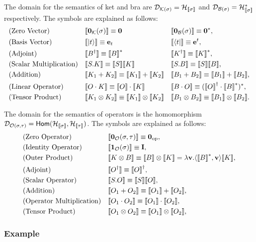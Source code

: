 \begin{definition}
  The domain for the semantics of ket and bra are $\mathcal{D}_{\mathcal{K}(\sigma)} = \mathcal{H}_{{\llbracket \sigma \rrbracket}}$ and $\mathcal{D}_{\mathcal{B}(\sigma)} = \mathcal{H}_{{\llbracket \sigma \rrbracket}}^*$ respectively.
  The symbols are explained as follows:
  \begin{align*}
    & \text{(Zero Vector)} &&
    {\llbracket \mathbf{0}_\mathcal{K}(\sigma) \rrbracket} \equiv \mathbf{0} && {\llbracket \mathbf{0}_\mathcal{B}(\sigma) \rrbracket} \equiv \mathbf{0}^*, \\
    & \text{(Basis Vector)} &&
    {\llbracket \ket{t} \rrbracket} \equiv \mathbf{e}_t && {\llbracket \bra{t} \rrbracket} \equiv \mathbf{e}^t, \\
    & \text{(Adjoint)} &&
    {\llbracket B^\dagger \rrbracket} \equiv {\llbracket B \rrbracket}^* && {\llbracket K^\dagger \rrbracket} \equiv {\llbracket K \rrbracket}^*, \\
    & \text{(Scalar Multiplication)} &&
    {\llbracket S.K \rrbracket} \equiv {\llbracket S \rrbracket} {\llbracket K \rrbracket} && {\llbracket S.B \rrbracket} \equiv {\llbracket S \rrbracket} {\llbracket B \rrbracket}, \\
    & \text{(Addition)} &&
    {\llbracket K_1 + K_2 \rrbracket} \equiv {\llbracket K_1 \rrbracket} + {\llbracket K_2 \rrbracket} && {\llbracket B_1 + B_2 \rrbracket} \equiv {\llbracket B_1 \rrbracket} + {\llbracket B_2 \rrbracket}, \\
    & \text{(Linear Operator)} &&
    {\llbracket O \cdot K \rrbracket} \equiv {\llbracket O \rrbracket} \cdot {\llbracket K \rrbracket} && {\llbracket B \cdot O \rrbracket} \equiv ({\llbracket O \rrbracket}^\dagger \cdot {\llbracket B \rrbracket}^*)^*, \\
    & \text{(Tensor Product)} &&
    {\llbracket K_1 \otimes K_2 \rrbracket} \equiv {\llbracket K_1 \rrbracket} \otimes {\llbracket K_2 \rrbracket} && {\llbracket B_1 \otimes B_2 \rrbracket} \equiv {\llbracket B_1 \rrbracket} \otimes {\llbracket B_2 \rrbracket}.
  \end{align*}
\end{definition}



\begin{definition}
  The domain for the semantics of operators is the homomorphism $\mathcal{D}_{\mathcal{O}(\sigma, \tau)} = \textsf{Hom}(\mathcal{H}_{\llbracket \sigma \rrbracket}, \mathcal{H}_{\llbracket \tau \rrbracket})$.
  The symbols are explained as follows:
  \begin{align*}
    & \text{(Zero Operator)} &&
    {\llbracket \mathbf{0}_\mathcal{O}(\sigma, \tau) \rrbracket} \equiv \mathbf{0}_{\textrm{op}}, \\
    & \text{(Identity Operator)} &&
    {\llbracket \mathbf{1}_\mathcal{O}(\sigma) \rrbracket} \equiv \mathbf{I}, \\
    & \text{(Outer Product)} &&
    {\llbracket K \otimes B \rrbracket} \equiv {\llbracket B \rrbracket} \otimes {\llbracket K \rrbracket} = \lambda \mathbf{v}. \langle {\llbracket B \rrbracket}^*, \mathbf{v}\rangle {\llbracket K \rrbracket}, \\
    & \text{(Adjoint)} &&
    {\llbracket O^\dagger \rrbracket} \equiv {\llbracket O \rrbracket}^\dagger, \\
    & \text{(Scalar Operator)} &&
    {\llbracket S.O \rrbracket} \equiv {\llbracket S \rrbracket} {\llbracket O \rrbracket}, \\
    & \text{(Addition)} &&
    {\llbracket O_1 + O_2 \rrbracket} \equiv {\llbracket O_1 \rrbracket}+{\llbracket O_2 \rrbracket}, \\
    & \text{(Operator Multiplication)} &&
    {\llbracket O_1 \cdot O_2 \rrbracket} \equiv {\llbracket O_1 \rrbracket} \cdot {\llbracket O_2 \rrbracket}, \\
    & \text{(Tensor Product)} &&
    {\llbracket O_1 \otimes O_2 \rrbracket} \equiv {\llbracket O_1 \rrbracket} \otimes {\llbracket O_2 \rrbracket},
  \end{align*}
\end{definition}

\subsubsection*{Example}
